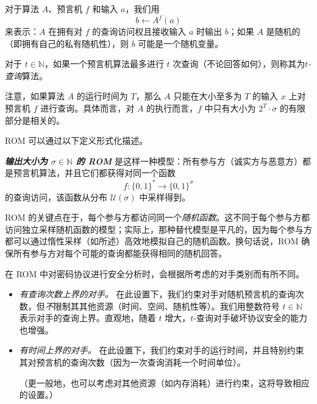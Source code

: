 \documentclass[american,singlepageview]{snargs-book-zh}
\newcommand{\defemph}[1]{\textbf{\emph{#1}}}
\newcommand{\Bits}{\{0,1\}}
\newcommand{\Naturals}{\mathbb{N}}
\newcommand{\ProtoAdversary}{A}
\newcommand{\ROFunction}{f}
\newcommand{\ROQueryBound}{t}
\newcommand{\RODistribution}[1]{\mathcal{U}(#1)}
\newcommand{\ROQuery}{x}
\newcommand{\ROAdversary}{\ProtoAdversary}
\newcommand{\ROOutputSize}{\sigma}
\begin{document}
对于算法 $\ROAdversary$、预言机 $\ROFunction$ 和输入 $a$，我们用
\begin{equation*}
b \gets \ROAdversary^{\ROFunction}(a)
\end{equation*}
来表示：$\ROAdversary$ 在拥有对 $\ROFunction$ 的查询访问权且接收输入 $a$ 时输出 $b$；如果 $\ROAdversary$ 是随机的（即拥有自己的私有随机性），则 $b$ 可能是一个随机变量。

对于 $\ROQueryBound \in \Naturals$，如果一个预言机算法最多进行 $\ROQueryBound$ 次查询（不论回答如何），则称其为\emph{$\ROQueryBound$-查询}算法。

注意，如果算法 $\ROAdversary$ 的运行时间为 $T$，那么 $\ROAdversary$ 只能在大小至多为 $T$ 的输入 $\ROQuery$ 上对预言机 $\ROFunction$ 进行查询。具体而言，对 $\ROAdversary$ 的执行而言，$\ROFunction$ 中只有大小为 $2^{T} \cdot \ROOutputSize$ 的有限部分是相关的。

ROM 可以通过以下定义形式化描述。

\begin{definition}
\label{definition:the-rom}
\defemph{输出大小为 $\ROOutputSize \in \Naturals$ 的 ROM} 是这样一种模型：所有参与方（诚实方与恶意方）都是预言机算法，并且它们都获得对同一个函数
$$
\ROFunction \colon \Bits^{*} \to \Bits^{\ROOutputSize}
$$
的查询访问，该函数从分布 $\RODistribution{\ROOutputSize}$ 中采样得到。
\end{definition}

ROM 的关键点在于，每个参与方都访问同一个\emph{随机函数}。这不同于每个参与方都访问独立采样随机函数的模型；实际上，那种替代模型是平凡的，因为每个参与方都可以通过惰性采样（如所述）高效地模拟自己的随机函数。换句话说，ROM 确保所有参与方对每个可能的查询都能获得相同的随机回答。

在 ROM 中对密码协议进行安全分析时，会根据所考虑的对手类别而有所不同。
\begin{itemize}

  \item \emph{有查询次数上界的对手。} 在此设置下，我们约束对手对随机预言机的查询次数，但\emph{不}限制其其他资源（时间、空间、随机性等）。我们用整数符号 $\ROQueryBound \in \Naturals$ 表示对手的查询上界。直观地，随着 $\ROQueryBound$ 增大，$\ROQueryBound$-查询对手破坏协议安全的能力也增强。

  \item \emph{有时间上界的对手。} 在此设置下，我们约束对手的运行时间，并且特别约束其对预言机的查询次数（因为一次查询消耗一个时间单位）。

  （更一般地，也可以考虑对其他资源（如内存消耗）进行约束，这将导致相应的设置。）

\end{itemize}
\end{document}
